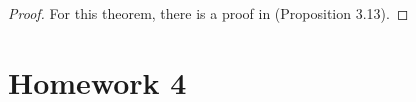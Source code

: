 \documentclass[a4 paper, 12pt]{article}
\begin{document}
\begin{proof}


For this theorem, there is a proof in \cite{b4} (Proposition 3.13).
        

\end{proof}


\section{Homework 4}
~~~~~
\end{document}
